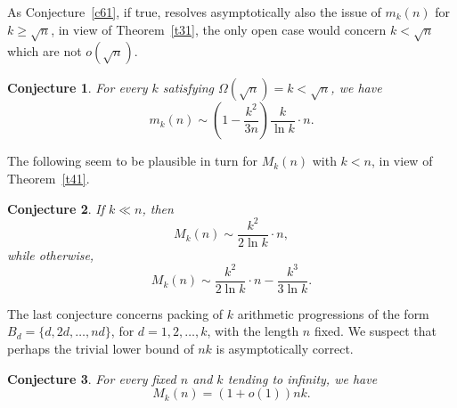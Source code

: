 \documentclass[12pt]{amsart}
\theoremstyle{plain}
\newtheorem{conjecture}{Conjecture}
\numberwithin{equation}{section}
\begin{document}
	As Conjecture~\ref{c61}, if true, resolves asymptotically also the issue of $m_k(n)$ for $k\geqslant\sqrt{n}$, in view of Theorem~\ref{t31}, the only open case would concern $k<\sqrt{n}$ which are not $o(\sqrt{n})$.
	\begin{conjecture}
		For every $k$ satisfying $\Omega(\sqrt{n})=k<\sqrt{n}$, we have $$m_k(n)\sim \left(1-\frac{k^2}{3n}\right)\frac{k}{\ln k}\cdot n.$$
	\end{conjecture}
	The following seem to be plausible in turn for $M_k(n)$ with $k<n$, in view of Theorem~\ref{t41}.
	\begin{conjecture}
	If $k\ll n$, then $$M_k(n)\sim \frac{k^2}{2\ln k}\cdot n,$$
	while otherwise, $$M_k(n)\sim \frac{k^2}{2\ln k}\cdot n-\frac{k^3}{3\ln k}.$$
	\end{conjecture}

The last conjecture concerns packing of $k$ arithmetic progressions of the form $B_d=\{d,2d,\ldots,nd\}$, for $d=1,2,\ldots,k$, with the length $n$ fixed. We suspect that perhaps the trivial lower bound of $nk$ is asymptotically correct. 
\begin{conjecture}
For every fixed $n$ and $k$ tending to infinity, we have 
$$M_k(n)=(1+o(1))nk.$$
\end{conjecture}
\end{document}
